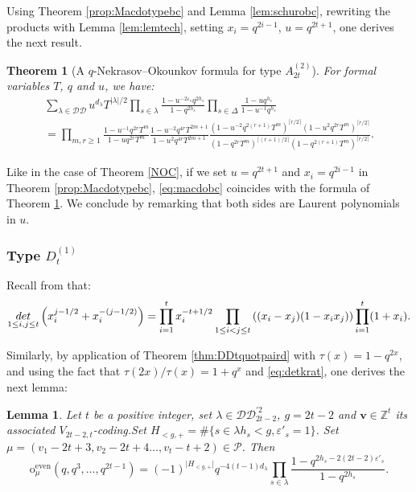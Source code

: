 \documentclass[11pt,letterpaper]{amsart}
\def\bbbz{\mathbb Z}
\def\ccdd{\mathcal {DD}}
\def\ccp{\mathcal P}
\def\det{{\rm det}}
\newtheorem{thm}[df]{Theorem}
\newtheorem{lm}[df]{Lemma}
\renewcommand{\oe}{\mathrm{o}^{\text{even}}}
\numberwithin{equation}{section}
\numberwithin{df}{section}
\begin{document}
Using Theorem \ref{prop:Macdotypebc} and Lemma \ref{lem:schurobc}, rewriting the products with Lemma \ref{lem:lemtech}, setting $x_i=q^{2i-1}$, $u=q^{2t+1}$, one derives the next result.
\begin{thm}[A $q$-Nekrasov--Okounkov formula for type $A^{(2)}_{2t}$]\label{NOBC}
For formal variables $T$, $q$ and $u$, we have:
\begin{multline*}
\sum_{\lambda\in\ccdd} u^{d_\lambda}T^{\lvert \lambda\rvert/2}\prod_{s\in\lambda}\frac{1-u^{-2\varepsilon_s}q^{2h_s}}{1-q^{2h_s}}\prod_{s\in\Delta}\frac{1-uq^{h_s}}{1-u^{-1}q^{h_s}}\\=
\prod_{m,r\geq 1}\frac{1-u^{-1}q^{2r}T^{m}}{1-uq^{2r}T^{m}}\frac{1-u^{-2}q^{4r}T^{2m+1}}{1-u^2q^{4r}T^{2m+1}}\frac{\left(1-u^{-2}q^{2(r+1)}T^m\right)^{\lceil r/2 \rceil}\left(1-u^2q^{2r}T^m\right)^{\lceil r/2 \rceil}}{\left(1-q^{2r}T^m\right)^{\lceil (r+1)/2 \rceil}\left(1-q^{2(r+1)}T^m\right)^{\lceil r/2 \rceil}}.
\end{multline*}
\end{thm}

Like in the case of Theorem \ref{NOC}, if we set $u=q^{2t+1}$ and $x_i=q^{2i-1}$ in Theorem \ref{prop:Macdotypebc}, \eqref{eq:macdobc} coincides with the formula of Theorem \ref{NOBC}. We conclude by remarking that both sides are Laurent polynomials in $u$.

\subsubsection{Type $D^{(1)}_{t}$}
Recall from \cite[eqn $(2.6)$]{Kradet1} that:
\begin{equation}\label{eq:detkrat}
\underset{1\le i,j\le t}{\det}\left(x_i^{j-1/2}+x_i^{-(j-1/2)}\right)=\prod_{i=1}^t x_i^{-t+1/2}\prod_{1\leq i<j\leq t} \left((x_i-x_j)(1-x_ix_j)\right)\prod_{i=1}^t(1+x_i). 
\end{equation}

Similarly, by application of Theorem \ref{thm:DDtquotpaird} with $\tau(x)=1-q^{2x}$, and using the fact that $\tau(2x)/\tau(x)=1+q^x$ and \eqref{eq:detkrat}, one derives the next lemma: 

\begin{lm}\label{lem:schurd}
Let $t$ be a positive integer, set $\lambda\in\ccdd_{2t-2}^{'2}$, $g=2t-2$ and $\mathbf{v}\in\bbbz^t$ its associated $V_{2t-2,t}$-coding.Set $H_{<g,+}=\#\lbrace s\in\lambda h_s<g, \varepsilon'_s=1\rbrace$. Set $\mu=(v_1-2t+3,v_2-2t+4\dots,v_t-t+2)\in\ccp$. Then
 \begin{equation*}\label{eq:schuroe}
\oe_{\mu}(q,q^{3},\dots,q^{2t-1})=(-1)^{\lvert H_{<g,+}\rvert} q^{-4(t-1)d_\lambda}\prod_{s\in\lambda}\frac{1-q^{2h_s-2(2t-2)\varepsilon'_s}}{1-q^{2h_s}}.
 \end{equation*}
 \end{lm}
 
\end{document}
